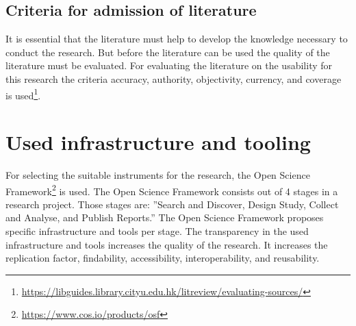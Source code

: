 \subsection{Criteria for admission of literature}
It is essential that the literature must help to develop the knowledge necessary to conduct the research. But before the literature can be used the quality of the literature must be evaluated. For evaluating the literature on the usability for this research the criteria accuracy, authority, objectivity, currency, and coverage is used\footnote{\url{https://libguides.library.cityu.edu.hk/litreview/evaluating-sources/}}.



\section{Used infrastructure and tooling}
For selecting the suitable instruments for the research, the Open Science Framework\footnote{\url{https://www.cos.io/products/osf}} is used. The Open Science Framework consists out of 4 stages in a research project. Those stages are: ''Search and Discover, Design Study, Collect and Analyse, and Publish Reports.'' The Open Science Framework proposes specific infrastructure and tools per stage. The transparency in the used infrastructure and tools increases the quality of the research. It increases the replication factor, findability, accessibility, interoperability, and reusability.
